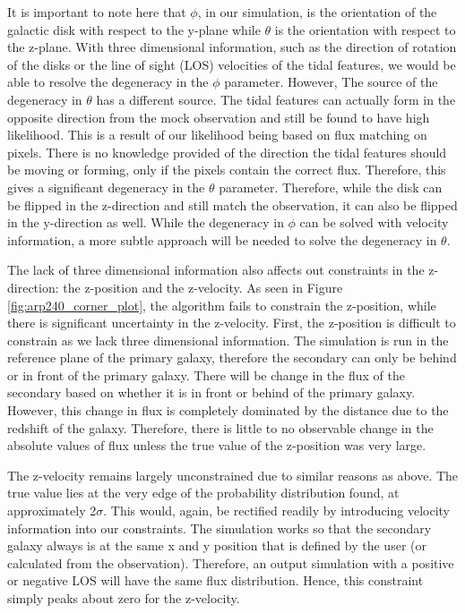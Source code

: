 It is important to note here that $\phi$, in our simulation, is the orientation of the galactic disk with respect to the y-plane while $\theta$ is the orientation with respect to the z-plane. With three dimensional information, such as the direction of rotation of the disks or the line of sight (LOS) velocities of the tidal features, we would be able to resolve the degeneracy in the $\phi$ parameter. However, The source of the degeneracy in $\theta$ has a different source. The tidal features can actually form in the opposite direction from the mock observation and still be found to have high likelihood. This is a result of our likelihood being based on flux matching on pixels. There is no knowledge provided of the direction the tidal features should be moving or forming, only if the pixels contain the correct flux. Therefore, this gives a significant degeneracy in the $\theta$ parameter. Therefore, while the disk can be flipped in the z-direction and still match the observation, it can also be flipped in the y-direction as well. While the degeneracy in $\phi$ can be solved with velocity information, a more subtle approach will be needed to solve the degeneracy in $\theta$.

The lack of three dimensional information also affects out constraints in the z-direction: the z-position and the z-velocity. As seen in Figure \ref{fig:arp240_corner_plot}, the algorithm fails to constrain the z-position, while there is significant uncertainty in the z-velocity. First, the z-position is difficult to constrain as we lack three dimensional information. The simulation is run in the reference plane of the primary galaxy, therefore the secondary can only be behind or in front of the primary galaxy. There will be change in the flux of the secondary based on whether it is in front or behind of the primary galaxy. However, this change in flux is completely dominated by the distance due to the redshift of the galaxy. Therefore, there is little to no observable change in the absolute values of flux unless the true value of the z-position was very large.

The z-velocity remains largely unconstrained due to similar reasons as above. The true value lies at the very edge of the probability distribution found, at approximately 2$\sigma$. This would, again, be rectified readily by introducing velocity information into our constraints. The simulation works so that the secondary galaxy always is at the same x and y position that is defined by the user (or calculated from the observation). Therefore, an output simulation with a positive or negative LOS will have the same flux distribution. Hence, this constraint simply peaks about zero for the z-velocity.

